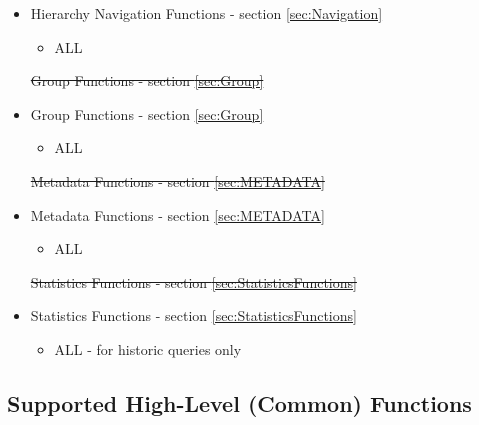\documentclass[12pt]{report} %
\providecommand{\DIFdeltex}[1]{{\protect\color{red}\sout{#1}}}                      %
\providecommand{\DIFaddbegin}{} %
\providecommand{\DIFaddend}{} %
\providecommand{\DIFdelbegin}{} %
\providecommand{\DIFdelend}{} %
\providecommand{\DIFdel}[1]{\texorpdfstring{\DIFdeltex{#1}}{}} %
\newcommand{\DIFscaledelfig}{0.5}
\newlength{\DIFdelgraphicswidth} %
\newlength{\DIFdelgraphicsheight} %
\newcommand{\DIFaddincludegraphics}[2][]{{\color{blue}\fbox{\DIFOincludegraphics[#1]{#2}}}} %
\newcommand{\DIFdelincludegraphics}[2][]{%
\sbox{\DIFdelgraphicsbox}{\DIFOincludegraphics[#1]{#2}}%
\settoboxwidth{\DIFdelgraphicswidth}{\DIFdelgraphicsbox} %
\settoboxtotalheight{\DIFdelgraphicsheight}{\DIFdelgraphicsbox} %
\scalebox{\DIFscaledelfig}{%
\parbox[b]{\DIFdelgraphicswidth}{\usebox{\DIFdelgraphicsbox}\\[-\baselineskip] \rule{\DIFdelgraphicswidth}{0em}}\llap{\resizebox{\DIFdelgraphicswidth}{\DIFdelgraphicsheight}{%
\setlength{\unitlength}{\DIFdelgraphicswidth}%
\begin{picture}(1,1)%
\thicklines\linethickness{2pt} %
{\color[rgb]{1,0,0}\put(0,0){\framebox(1,1){}}}%
{\color[rgb]{1,0,0}\put(0,0){\line( 1,1){1}}}%
{\color[rgb]{1,0,0}\put(0,1){\line(1,-1){1}}}%
\end{picture}%
}\hspace*{3pt}}} %
} %
\DeclareRobustCommand{\DIFaddbegin}{\DIFOaddbegin \let\includegraphics\DIFaddincludegraphics} %
\DeclareRobustCommand{\DIFaddend}{\DIFOaddend \let\includegraphics\DIFOincludegraphics} %
\DeclareRobustCommand{\DIFdelbegin}{\DIFOdelbegin \let\includegraphics\DIFdelincludegraphics} %
\DeclareRobustCommand{\DIFdelend}{\DIFOaddend \let\includegraphics\DIFOincludegraphics} %
\begin{document}
\DIFdelend \begin{itemize}[noitemsep,nolistsep] 
	\item{Hierarchy Navigation Functions - section \ref{sec:Navigation}}
		\begin{itemize}[noitemsep,nolistsep] 
			\item{ALL}
		\end{itemize}
	\DIFdelbegin %
\DIFdel{Group Functions - section \ref{sec:Group}
	}\DIFdelend \DIFaddbegin \item{Group Functions - section \ref{sec:Group}}
		\DIFaddend \begin{itemize}[noitemsep,nolistsep] 
			\item{ALL}
		\end{itemize}
\DIFdelbegin %
\DIFdel{Metadata Functions - section \ref{sec:METADATA}
	}\DIFdelend \DIFaddbegin \item{Metadata Functions - section \ref{sec:METADATA}}
		\DIFaddend \begin{itemize}[noitemsep,nolistsep] 
			\item{ALL}
		\end{itemize}
	\DIFdelbegin %
\DIFdel{Statistics Functions - section \ref{sec:StatisticsFunctions}
	}\DIFdelend \DIFaddbegin \item{Statistics Functions - section \ref{sec:StatisticsFunctions}}
		\DIFaddend \begin{itemize}[noitemsep,nolistsep] 
			\item{ALL - for historic queries only}
		\end{itemize}
\end{itemize}


\subsection{Supported High-Level (Common) Functions}\label{sec:UserRMHighLevel}
\end{document}
